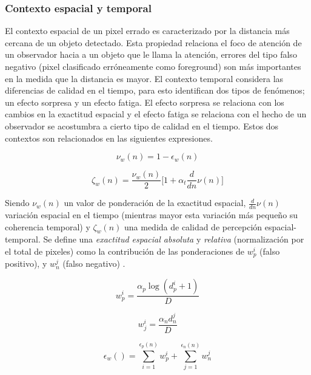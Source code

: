 \subsubsection{Contexto espacial y temporal}
El contexto espacial \cite{cavallaro_objective_2002} de un pixel errado es caracterizado por la distancia más cercana de un objeto detectado. Esta propiedad relaciona el foco de atención de un observador hacia a un objeto que le llama la atención, errores del tipo falso negativo (pixel clasificado erróneamente como foreground) son más importantes en la medida que la distancia es mayor. El contexto temporal considera las diferencias de calidad en el tiempo, para esto identifican dos tipos de fenómenos; un efecto sorpresa y un efecto fatiga. El efecto sorpresa se relaciona con los cambios en la exactitud espacial y el efecto fatiga se relaciona con el hecho de un observador se acostumbra a cierto tipo de calidad en el tiempo. Estos dos contextos son relacionados en las siguientes expresiones.

\begin{equation}
\nu_w(n) = 1 - \epsilon_w(n)
\end{equation}

\begin{equation}
\zeta_w(n) = \frac{\nu_w(n)}{2} \lbrack 1 + \alpha_t \frac{d}{dn}\nu(n) \rbrack
\end{equation}

Siendo $\nu_w(n)$ un valor de ponderación de la exactitud espacial, $\frac{d}{dn}\nu(n)$ variación espacial en el tiempo (mientras mayor esta variación más pequeño su coherencia temporal) y $\zeta_w(n)$ una medida de calidad de percepción espacial-temporal. Se define una \emph{exactitud espacial absoluta} y \emph{relativa} (normalización por el total de pixeles) como la contribución de las ponderaciones de $w^i_p$ (falso positivo), y $w^j_n$ (falso negativo) . 

\begin{equation}
w^i_p = \frac{\alpha_p \log(d^i_p + 1)}{D}
\end{equation}

\begin{equation}
w^i_j = \frac{\alpha_nd^j_n}{D}
\end{equation}

\begin{equation}
\epsilon_w() = \sum_{i=1}^{\epsilon_p(n)}w^i_p +	 \sum_{j=1}^{\epsilon_n(n)} w^j_n
\end{equation}


